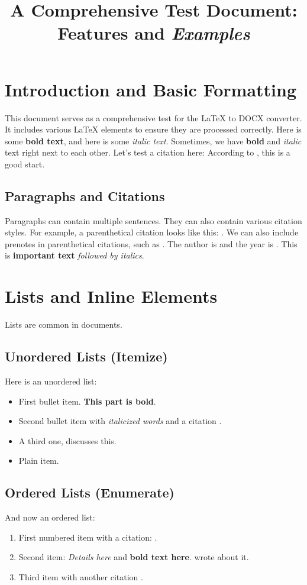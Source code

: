 \title{A Comprehensive Test Document: \textbf{Features} and \textit{Examples}}

\section{Introduction and Basic Formatting}
This document serves as a comprehensive test for the LaTeX to DOCX converter.
It includes various LaTeX elements to ensure they are processed correctly.
Here is some \textbf{bold text}, and here is some \textit{italic text}.
Sometimes, we have \textbf{bold} and \textit{italic} text right next to each other.
Let's test a citation here: According to \citet[Chapter 1, p.~10]{test_key_intro_2023}, this is a good start.

\subsection{Paragraphs and Citations}
Paragraphs can contain multiple sentences. They can also contain various citation styles.
For example, a parenthetical citation looks like this: \citep{test_key_para_A_2022, test_key_para_B_2022}.
We can also include prenotes in parenthetical citations, such as \citep[see details in][Section 2]{test_key_para_C_2021}.
The author is \citeauthor{test_key_author_2000} and the year is \citeyearpar[around page 5]{test_key_year_1999}.
This is \textbf{important text} \textit{followed by italics}.

\section{Lists and Inline Elements}
Lists are common in documents.

\subsection{Unordered Lists (Itemize)}
Here is an unordered list:
\begin{itemize}
    \item First bullet item. \textbf{This part is bold}.
    \item Second bullet item with \textit{italicized words} and a citation \citep{test_key_bullet_2024}.
    \item A third one, \citet[e.g.,][]{test_key_bullet_citet_2024} discusses this.
    \item Plain item.
\end{itemize}

\subsection{Ordered Lists (Enumerate)}
And now an ordered list:
\begin{enumerate}
    \item First numbered item with a citation: \citep{test_key_enum_A_2023}.
    \item Second item: \textit{Details here} and \textbf{bold text here}. \citeauthor{test_key_enum_author_B_2023} wrote about it.
    \item Third item with another citation \citeyearpar[p.~77]{test_key_enum_year_C_2023}.
\end{enumerate}

